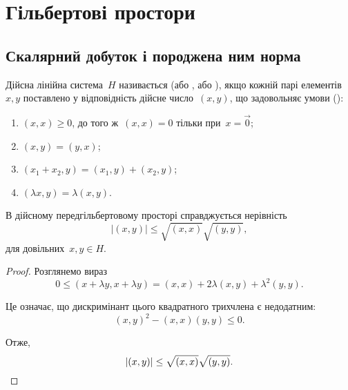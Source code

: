 \chapter{Гільбертові простори}

\section{Скалярний добуток і породжена ним норма}

\begin{definition}
    Дійсна лінійна система~$H$ називається  (або , або ), якщо кожній парі елементів~$x, y$ поставлено у відповідність дійсне число~$(x, y)$, що задовольняє умови ():
    \begin{enumerate}
        \item $(x, x) \ge 0$, до того ж~$(x, x) = 0$ тільки при~$x = \vec 0$;
        \item $(x, y) = (y, x)$;
        \item $(x_1 + x_2, y) = (x_1, y) + (x_2, y)$;
        \item $(\lambda x, y) = \lambda (x, y)$.
    \end{enumerate}
\end{definition}

\begin{lemma}
    В дійсному передгільбертовому просторі справджується нерівність
    \begin{equation*}
        |(x, y)| \le \sqrt{(x, x)} \sqrt{(y, y)},
    \end{equation*}
    для довільних~$x, y \in H$.
\end{lemma}

\begin{proof}
    Розглянемо вираз
    \begin{equation*}
        0 \le (x + \lambda y, x + \lambda y) = (x, x) + 2 \lambda (x, y) + \lambda^2 (y, y).
    \end{equation*}
    
    Це означає, що дискримінант цього квадратного трихчлена є недодатним:
    \begin{equation*}
        (x, y)^2 - (x, x) (y, y) \le 0.
    \end{equation*}
    
    Отже,
    \begin{equation*}
    |(x, y)| \le \sqrt{(x, x)} \sqrt{(y, y)}. \qedhere
    \end{equation*}
\end{proof}

